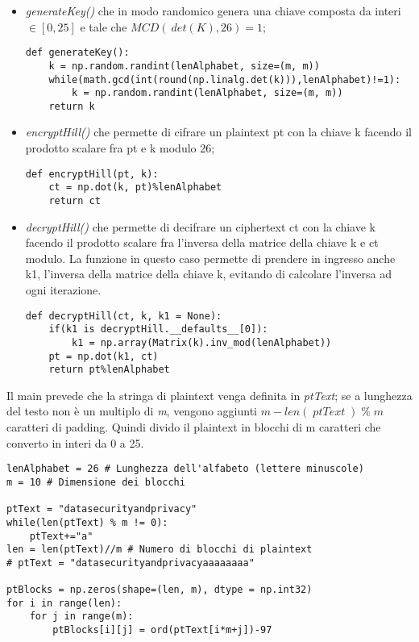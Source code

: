 \documentclass{article}
\begin{document}
\begin{itemize}

\item \textit{generateKey()} che in modo randomico genera una chiave composta da interi $\in [0,25]$ e tale che $MCD(\: det(K),26) = 1$;
\begin{lstlisting}
def generateKey():
    k = np.random.randint(lenAlphabet, size=(m, m)) 
    while(math.gcd(int(round(np.linalg.det(k))),lenAlphabet)!=1):
        k = np.random.randint(lenAlphabet, size=(m, m)) 
    return k
\end{lstlisting}

\item \textit{encryptHill()} che permette di cifrare un plaintext pt con la chiave k facendo il prodotto scalare fra pt e k modulo 26;
\begin{lstlisting}
def encryptHill(pt, k):
    ct = np.dot(k, pt)%lenAlphabet
    return ct
\end{lstlisting}

\item \textit{decryptHill()} che permette di decifrare un ciphertext ct con la chiave k facendo il prodotto scalare fra l'inversa della matrice della chiave k e ct modulo. La funzione in questo caso permette di prendere in ingresso anche k1, l'inversa della matrice della chiave k, evitando di calcolare l'inversa ad ogni iterazione.
\begin{lstlisting}
def decryptHill(ct, k, k1 = None):
    if(k1 is decryptHill.__defaults__[0]):
        k1 = np.array(Matrix(k).inv_mod(lenAlphabet))
    pt = np.dot(k1, ct)
    return pt%lenAlphabet
\end{lstlisting}
\end{itemize}
Il main prevede che la stringa di plaintext venga definita in \textit{ptText}; se a lunghezza del testo non è un multiplo di \textit{m}, vengono aggiunti $m -len(\;ptText\;)\;\% \; m $ caratteri di padding. Quindi divido il plaintext in blocchi di m caratteri che converto in interi da 0 a 25.
\begin{lstlisting}
lenAlphabet = 26 # Lunghezza dell'alfabeto (lettere minuscole)
m = 10 # Dimensione dei blocchi

ptText = "datasecurityandprivacy"
while(len(ptText) % m != 0):
    ptText+="a"
len = len(ptText)//m # Numero di blocchi di plaintext
# ptText = "datasecurityandprivacyaaaaaaaa"

ptBlocks = np.zeros(shape=(len, m), dtype = np.int32)
for i in range(len):
    for j in range(m):
        ptBlocks[i][j] = ord(ptText[i*m+j])-97
\end{lstlisting}
\end{document}
